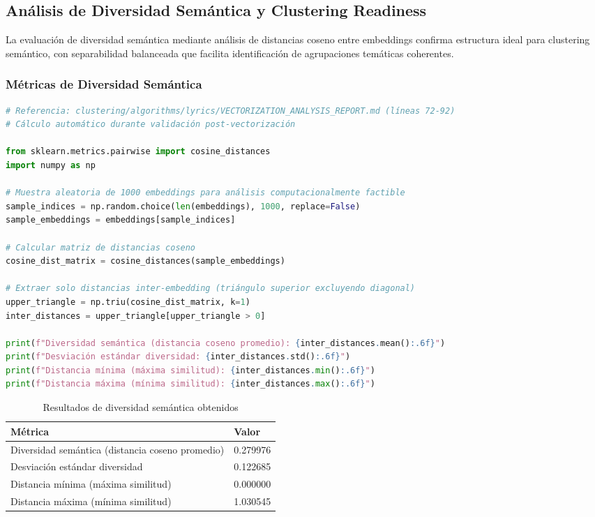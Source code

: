 \documentclass[12pt,a4paper]{report}
\begin{document}
\subsection{Análisis de Diversidad Semántica y Clustering Readiness}

La evaluación de diversidad semántica mediante análisis de distancias coseno entre embeddings confirma estructura ideal para clustering semántico, con separabilidad balanceada que facilita identificación de agrupaciones temáticas coherentes.

\subsubsection{Métricas de Diversidad Semántica}

\begin{lstlisting}[language=Python, caption={Análisis de distancias coseno inter-embedding}]
# Referencia: clustering/algorithms/lyrics/VECTORIZATION_ANALYSIS_REPORT.md (líneas 72-92)
# Cálculo automático durante validación post-vectorización

from sklearn.metrics.pairwise import cosine_distances
import numpy as np

# Muestra aleatoria de 1000 embeddings para análisis computacionalmente factible
sample_indices = np.random.choice(len(embeddings), 1000, replace=False)
sample_embeddings = embeddings[sample_indices]

# Calcular matriz de distancias coseno
cosine_dist_matrix = cosine_distances(sample_embeddings)

# Extraer solo distancias inter-embedding (triángulo superior excluyendo diagonal)
upper_triangle = np.triu(cosine_dist_matrix, k=1)
inter_distances = upper_triangle[upper_triangle > 0]

print(f"Diversidad semántica (distancia coseno promedio): {inter_distances.mean():.6f}")
print(f"Desviación estándar diversidad: {inter_distances.std():.6f}")
print(f"Distancia mínima (máxima similitud): {inter_distances.min():.6f}")
print(f"Distancia máxima (mínima similitud): {inter_distances.max():.6f}")
\end{lstlisting}

\begin{table}[h]
\centering
\caption{Resultados de diversidad semántica obtenidos}
\begin{tabular}{@{}ll@{}}
\toprule
\textbf{Métrica} & \textbf{Valor} \\
\midrule
Diversidad semántica (distancia coseno promedio) & 0.279976 \\
Desviación estándar diversidad & 0.122685 \\
Distancia mínima (máxima similitud) & 0.000000 \\
Distancia máxima (mínima similitud) & 1.030545 \\
\bottomrule
\end{tabular}
\end{table}
\end{document}
